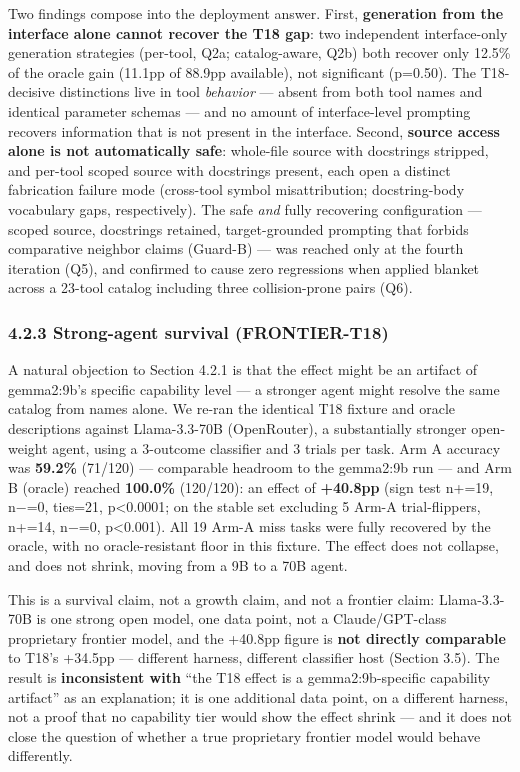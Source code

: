 Two findings compose into the deployment answer. First,
\textbf{generation from the interface alone cannot recover the T18 gap}:
two independent interface-only generation strategies (per-tool, Q2a;
catalog-aware, Q2b) both recover only 12.5\% of the oracle gain (11.1pp
of 88.9pp available), not significant (p=0.50). The T18-decisive
distinctions live in tool \emph{behavior} --- absent from both tool
names and identical parameter schemas --- and no amount of
interface-level prompting recovers information that is not present in
the interface. Second, \textbf{source access alone is not automatically
safe}: whole-file source with docstrings stripped, and per-tool scoped
source with docstrings present, each open a distinct fabrication failure
mode (cross-tool symbol misattribution; docstring-body vocabulary gaps,
respectively). The safe \emph{and} fully recovering configuration ---
scoped source, docstrings retained, target-grounded prompting that
forbids comparative neighbor claims (Guard-B) --- was reached only at
the fourth iteration (Q5), and confirmed to cause zero regressions when
applied blanket across a 23-tool catalog including three collision-prone
pairs (Q6).

\hypertarget{strong-agent-survival-frontier-t18}{%
\subsubsection{4.2.3 Strong-agent survival
(FRONTIER-T18)}\label{strong-agent-survival-frontier-t18}}

A natural objection to Section 4.2.1 is that the effect might be an
artifact of gemma2:9b's specific capability level --- a stronger agent
might resolve the same catalog from names alone. We re-ran the identical
T18 fixture and oracle descriptions against Llama-3.3-70B (OpenRouter),
a substantially stronger open-weight agent, using a 3-outcome classifier
and 3 trials per task. Arm A accuracy was \textbf{59.2\%} (71/120) ---
comparable headroom to the gemma2:9b run --- and Arm B (oracle) reached
\textbf{100.0\%} (120/120): an effect of \textbf{+40.8pp} (sign test
n+=19, n−=0, ties=21, p\textless0.0001; on the stable set excluding 5
Arm-A trial-flippers, n+=14, n−=0, p\textless0.001). All 19 Arm-A miss
tasks were fully recovered by the oracle, with no oracle-resistant floor
in this fixture. The effect does not collapse, and does not shrink,
moving from a 9B to a 70B agent.

This is a survival claim, not a growth claim, and not a frontier claim:
Llama-3.3-70B is one strong open model, one data point, not a
Claude/GPT-class proprietary frontier model, and the +40.8pp figure is
\textbf{not directly comparable} to T18's +34.5pp --- different harness,
different classifier host (Section 3.5). The result is
\textbf{inconsistent with} ``the T18 effect is a gemma2:9b-specific
capability artifact'' as an explanation; it is one additional data
point, on a different harness, not a proof that no capability tier would
show the effect shrink --- and it does not close the question of whether
a true proprietary frontier model would behave differently.

